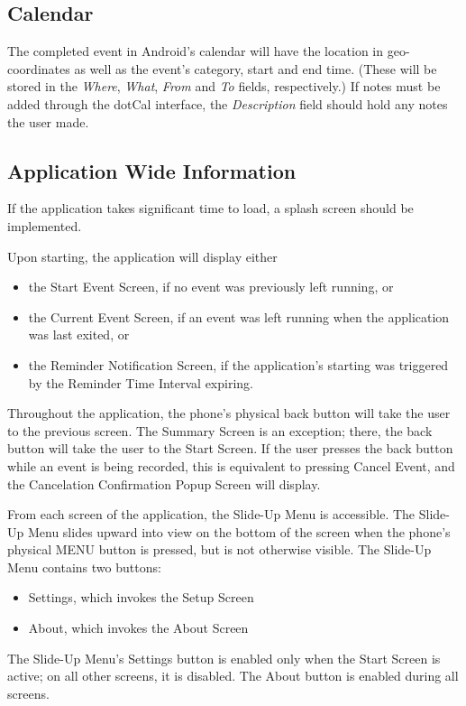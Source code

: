 \documentclass[11pt]{article}
\newcommand{\bt}[1]{{\sc #1}}
\begin{document}
\subsection{Calendar}
The completed event in Android's calendar will have the location in geo-coordinates as well as the event's category, start and end time. (These will be stored in the \emph{Where}, \emph{What}, \emph{From} and \emph{To} fields, respectively.) If notes must be added through the dotCal interface, the \emph{Description} field should hold any notes the user made.

\subsection{Application Wide Information}

If the application takes significant time to load, a splash screen should be implemented.

Upon starting, the application will display either
\begin{itemize}
	\item{the Start Event Screen, if no event was previously left running, or}
	\item{the Current Event Screen, if an event was left running when the application was last exited, or}
	\item{the Reminder Notification Screen, if the application's starting was triggered by the Reminder Time Interval expiring.}
\end{itemize}

Throughout the application, the phone's physical back button will take the user to the previous screen. The Summary Screen is an exception; there, the back button will take the user to the Start Screen.  If the user presses the back button while an event is being recorded, this is equivalent to pressing \bt{Cancel Event}, and the Cancelation Confirmation Popup Screen will display.

From each screen of the application, the Slide-Up Menu is accessible. The Slide-Up Menu slides upward into view on the bottom of the screen when the phone's physical MENU button is pressed, but is not otherwise visible. The Slide-Up Menu contains two buttons:
\begin{itemize}
	\item{\bt{Settings}, which invokes the Setup Screen}
	\item{\bt{About}, which invokes the About Screen}
\end{itemize}

The Slide-Up Menu's \bt{Settings} button is enabled only when the Start Screen is active; on all other screens, it is disabled. The \bt{About} button is enabled during all screens.
\end{document}

